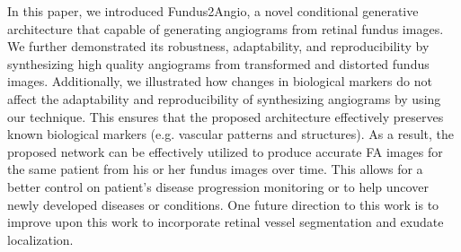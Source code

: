 \documentclass[runningheads]{llncs}
\begin{document}
In this paper, we introduced Fundus2Angio, a novel conditional generative architecture that capable of generating angiograms from retinal fundus images. We further demonstrated its robustness, adaptability, and reproducibility by synthesizing high quality angiograms from transformed and distorted fundus images. Additionally, we illustrated how changes in biological markers do not affect the adaptability and reproducibility of  synthesizing angiograms by using our technique. This ensures that the proposed architecture effectively preserves known biological markers (e.g. vascular patterns and structures). As a result, the proposed network can be effectively utilized to produce accurate FA images for the same patient from his or her fundus images over time. This allows for a better control on patient's disease progression monitoring or to help uncover newly developed diseases or conditions. One future direction to this work is to improve upon this work to incorporate retinal vessel segmentation and exudate localization.



\end{document}
